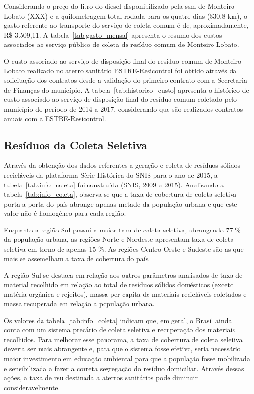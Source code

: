 	Considerando o preço do litro do diesel disponibilizado pela \gls{ssm} de Monteiro Lobato (XXX) e a quilometragem total rodada para os quatro dias (830,8 km), o gasto referente ao transporte do serviço de coleta comum é de, aproximadamente, R\$ 3.509,11. A tabela~\ref{tab:gasto_mensal} apresenta o resumo dos custos associados ao serviço público de coleta de resíduo comum de Monteiro Lobato.
	
%	
	O custo associado ao serviço de disposição final do resíduo comum de Monteiro Lobato realizado no aterro sanitário ESTRE-Resicontrol foi obtido através da solicitação dos contratos desde a validação do primeiro contrato com a Secretaria de Finanças do município. A tabela~\ref{tab:historico_custo} apresenta o histórico de custo associado ao serviço de disposição final do resíduo comum coletado pelo município do período de 2014 a 2017, considerando que são realizados contratos anuais com a ESTRE-Resicontrol.
	
%	
	
	\subsection{Resíduos da Coleta Seletiva}
	
	Através da obtenção dos dados referentes a geração e coleta de resíduos sólidos recicláveis da plataforma Série Histórica do SNIS para o ano de 2015, a tabela~\ref{tab:info_coleta} foi construída (SNIS, 2009 a 2015). Analisando a tabela~\ref{tab:info_coleta}, observa-se que a taxa de cobertura de coleta seletiva porta-a-porta do país abrange apenas metade da população urbana e que este valor não é homogêneo para cada região.
	
	Enquanto a região Sul possui a maior taxa de coleta seletiva, abrangendo 77 \% da população urbana, as regiões Norte e Nordeste apresentam taxa de coleta seletiva em torno de apenas 15 \%. As regiões Centro-Oeste e Sudeste são as que mais se assemelham a taxa de cobertura do país.
	
	A região Sul se destaca em relação aos outros parâmetros analisados de taxa de material recolhido em relação ao total de resíduos sólidos domésticos (exceto matéria orgânica e rejeitos), massa per capita de materiais recicláveis coletados e massa recuperada em relação a população urbana.
	
%	
	
	Os valores da tabela~\ref{tab:info_coleta} indicam que, em geral, o Brasil ainda conta com um sistema precário de coleta seletiva e recuperação dos materiais recolhidos. Para melhorar esse panorama, a taxa de cobertura de coleta seletiva deveria ser mais abrangente e, para que o sistema fosse efetivo, seria necessário maior investimento em educação ambiental para que a população fosse mobilizada e sensibilizada a fazer a correta segregação do resíduo domiciliar. Através dessas ações, a taxa de \gls{rsu} destinada a aterros sanitários pode diminuir consideravelmente.
	
